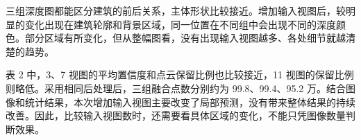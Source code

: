 三组深度图都能区分建筑的前后关系，主体形状比较接近。增加输入视图后，较明显的变化出现在建筑轮廓和背景区域，同一位置在不同组中会出现不同的深度颜色。部分区域有所变化，但从整幅图看，没有出现输入视图越多、各处细节就越清楚的趋势。

表 2 中，3、7 视图的平均置信度和点云保留比例也比较接近，11 视图的保留比例则略低。采用相同后处理后，三组融合点数分别约为 99.8、99.4、95.2 万。结合图像和统计结果，本次增加输入视图主要改变了局部预测，没有带来整体结果的持续改善。因此，比较输入视图数时，还需要看具体区域的变化，不能只凭图像数量判断效果。
